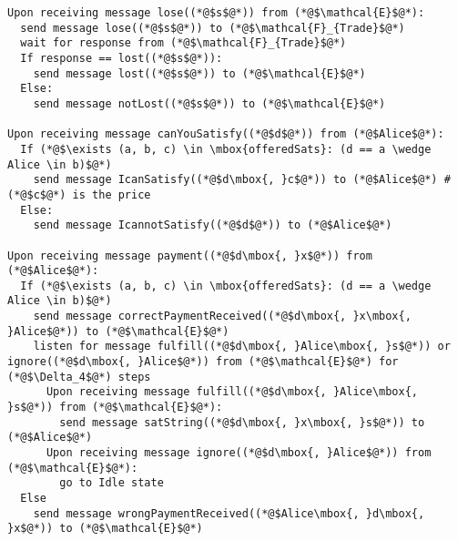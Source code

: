 \begin{lstlisting}[label=satprot, style=numbers]
Upon receiving message lose((*@$s$@*)) from (*@$\mathcal{E}$@*):
  send message lose((*@$s$@*)) to (*@$\mathcal{F}_{Trade}$@*)
  wait for response from (*@$\mathcal{F}_{Trade}$@*)
  If response == lost((*@$s$@*)):
    send message lost((*@$s$@*)) to (*@$\mathcal{E}$@*)
  Else:
    send message notLost((*@$s$@*)) to (*@$\mathcal{E}$@*)

Upon receiving message canYouSatisfy((*@$d$@*)) from (*@$Alice$@*):
  If (*@$\exists (a, b, c) \in \mbox{offeredSats}: (d == a \wedge Alice \in b)$@*)
    send message IcanSatisfy((*@$d\mbox{, }c$@*)) to (*@$Alice$@*) # (*@$c$@*) is the price
  Else:
    send message IcannotSatisfy((*@$d$@*)) to (*@$Alice$@*)

Upon receiving message payment((*@$d\mbox{, }x$@*)) from (*@$Alice$@*):
  If (*@$\exists (a, b, c) \in \mbox{offeredSats}: (d == a \wedge Alice \in b)$@*)
    send message correctPaymentReceived((*@$d\mbox{, }x\mbox{, }Alice$@*)) to (*@$\mathcal{E}$@*)
    listen for message fulfill((*@$d\mbox{, }Alice\mbox{, }s$@*)) or ignore((*@$d\mbox{, }Alice$@*)) from (*@$\mathcal{E}$@*) for (*@$\Delta_4$@*) steps
      Upon receiving message fulfill((*@$d\mbox{, }Alice\mbox{, }s$@*)) from (*@$\mathcal{E}$@*):
        send message satString((*@$d\mbox{, }x\mbox{, }s$@*)) to (*@$Alice$@*)
      Upon receiving message ignore((*@$d\mbox{, }Alice$@*)) from (*@$\mathcal{E}$@*):
        go to Idle state
  Else
    send message wrongPaymentReceived((*@$Alice\mbox{, }d\mbox{, }x$@*)) to (*@$\mathcal{E}$@*)
\end{lstlisting}
